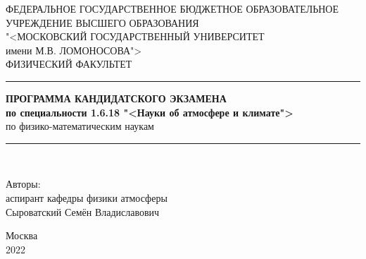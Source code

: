 \begin{titlepage}
\begin{center}
ФЕДЕРАЛЬНОЕ ГОСУДАРСТВЕННОЕ БЮДЖЕТНОЕ ОБРАЗОВАТЕЛЬНОЕ \\
УЧРЕЖДЕНИЕ ВЫСШЕГО ОБРАЗОВАНИЯ \\
"<МОСКОВСКИЙ ГОСУДАРСТВЕННЫЙ УНИВЕРСИТЕТ \\
имени М.В. ЛОМОНОСОВА"> \\ [2em]
ФИЗИЧЕСКИЙ ФАКУЛЬТЕТ \\ [12em]
\rule{\linewidth}{1pt}
\textbf{ПРОГРАММА КАНДИДАТСКОГО ЭКЗАМЕНА \\
по специальности 1.6.18 "<Науки об атмосфере и климате">} \\ [2em]
по физико-математическим наукам
\rule{\linewidth}{1pt} \\ [12em]
\end{center}
\hfill
\begin{minipage}{0.5\textwidth}\raggedleft
Авторы: \\
аспирант кафедры физики атмосферы \\
Сыроватский Семён Владиславович
\end{minipage}
\vfill
\begin{center}
Москва \\
2022
\end{center}
\end{titlepage}
